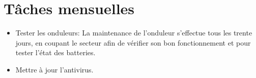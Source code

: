 \section*{Tâches mensuelles}
\begin{itemize}
\item Tester les onduleurs: La maintenance de l’onduleur s’effectue tous les trente jours, en coupant le secteur afin de vérifier son bon fonctionnement et pour tester l’état des batteries. \\
\item Mettre à jour l’antivirus.
\end{itemize}
